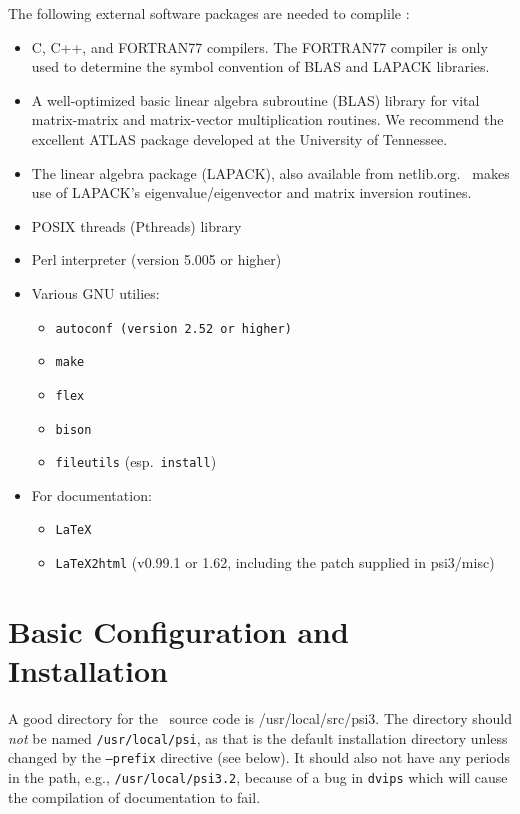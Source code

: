 \documentclass[12pt]{article}
\begin{document}
The following external software packages are needed to complile \PSIthree:
\begin{itemize}
\item C, C++, and FORTRAN77 compilers. The FORTRAN77 compiler is only used to determine
the symbol convention of BLAS and LAPACK libraries.
\item A well-optimized basic linear algebra subroutine (BLAS) library
  for vital matrix-matrix and matrix-vector multiplication routines.
  We recommend the excellent ATLAS package developed at the University
  of Tennessee.  
\item The linear algebra package (LAPACK), also available from
  netlib.org.  \PSIthree\ makes use of LAPACK's eigenvalue/eigenvector
  and matrix inversion routines.  
\item POSIX threads (Pthreads) library
\item Perl interpreter (version 5.005 or higher)
\item Various GNU utilies: 
\begin{itemize}
\item {\tt autoconf (version 2.52 or higher)}
\item {\tt make}
\item {\tt flex}
\item {\tt bison}
\item {\tt fileutils} (esp.\ {\tt install})
\end{itemize}
\item For documentation:
\begin{itemize}
\item {\tt LaTeX}
\item {\tt LaTeX2html} (v0.99.1 or 1.62, including the patch supplied in
psi3/misc)
\end{itemize}
\end{itemize}

\section{Basic Configuration and Installation}

A good directory for the \PSIthree\ source code is /usr/local/src/psi3.
The directory should {\em not} be named {\tt /usr/local/psi}, as that is
the default installation directory unless changed by the {\tt --prefix}
directive (see below).  It should also not have any periods in the path,
e.g., {\tt /usr/local/psi3.2}, because of a bug in {\tt dvips} which will
cause the compilation of documentation to fail.
\end{document}
